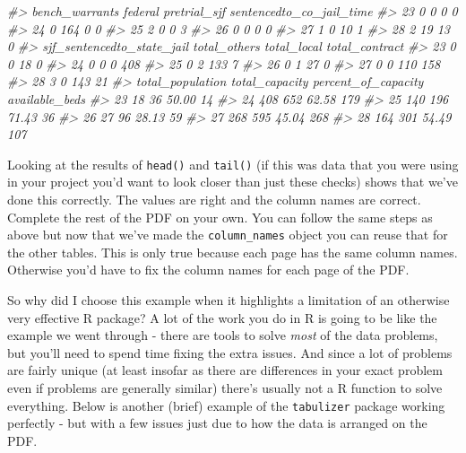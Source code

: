 \documentclass[
  12pt,
]{book}
\newenvironment{Shaded}{\begin{snugshade}}{\end{snugshade}}
\newcommand{\CommentTok}[1]{\textcolor[rgb]{0.37,0.37,0.37}{\textit{#1}}}
\begin{document}
\begin{Shaded}
\begin{Highlighting}[]
\CommentTok{\#>    bench\_warrants federal pretrial\_sjf sentencedto\_co\_jail\_time}
\CommentTok{\#> 23              0       0            0                        0}
\CommentTok{\#> 24              0     164            0                        0}
\CommentTok{\#> 25              2       0            0                        3}
\CommentTok{\#> 26              0       0            0                        0}
\CommentTok{\#> 27              1       0           10                        1}
\CommentTok{\#> 28              2      19           13                        0}
\CommentTok{\#>    sjf\_sentencedto\_state\_jail total\_others total\_local total\_contract}
\CommentTok{\#> 23                          0            0          18              0}
\CommentTok{\#> 24                          0            0           0            408}
\CommentTok{\#> 25                          0            2         133              7}
\CommentTok{\#> 26                          0            1          27              0}
\CommentTok{\#> 27                          0            0         110            158}
\CommentTok{\#> 28                          3            0         143             21}
\CommentTok{\#>    total\_population total\_capacity percent\_of\_capacity available\_beds}
\CommentTok{\#> 23               18             36               50.00             14}
\CommentTok{\#> 24              408            652               62.58            179}
\CommentTok{\#> 25              140            196               71.43             36}
\CommentTok{\#> 26               27             96               28.13             59}
\CommentTok{\#> 27              268            595               45.04            268}
\CommentTok{\#> 28              164            301               54.49            107}
\end{Highlighting}
\end{Shaded}

Looking at the results of \texttt{head()} and \texttt{tail()} (if this was data that you were using in your project you'd want to look closer than just these checks) shows that we've done this correctly. The values are right and the column names are correct. Complete the rest of the PDF on your own. You can follow the same steps as above but now that we've made the \texttt{column\_names} object you can reuse that for the other tables. This is only true because each page has the same column names. Otherwise you'd have to fix the column names for each page of the PDF.

So why did I choose this example when it highlights a limitation of an otherwise very effective R package? A lot of the work you do in R is going to be like the example we went through - there are tools to solve \emph{most} of the data problems, but you'll need to spend time fixing the extra issues. And since a lot of problems are fairly unique (at least insofar as there are differences in your exact problem even if problems are generally similar) there's usually not a R function to solve everything. Below is another (brief) example of the \texttt{tabulizer} package working perfectly - but with a few issues just due to how the data is arranged on the PDF.
\end{document}
